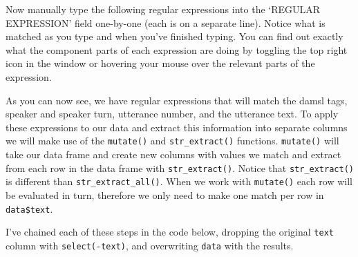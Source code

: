 \documentclass[
  letterpaper,
  DIV=11,
  numbers=noendperiod]{scrreport}
\newenvironment{Shaded}{\begin{snugshade}}{\end{snugshade}}
\newcommand{\NormalTok}[1]{\textcolor[rgb]{0.00,0.00,0.00}{#1}}
\theoremstyle{definition}
\theoremstyle{remark}
\begin{document}
Now manually type the following regular expressions into the `REGULAR
EXPRESSION' field one-by-one (each is on a separate line). Notice what
is matched as you type and when you've finished typing. You can find out
exactly what the component parts of each expression are doing by
toggling the top right icon in the window or hovering your mouse over
the relevant parts of the expression.

\begin{Shaded}
\end{Shaded}

As you can now see, we have regular expressions that will match the
damsl tags, speaker and speaker turn, utterance number, and the
utterance text. To apply these expressions to our data and extract this
information into separate columns we will make use of the
\texttt{mutate()} and \texttt{str\_extract()} functions.
\texttt{mutate()} will take our data frame and create new columns with
values we match and extract from each row in the data frame with
\texttt{str\_extract()}. Notice that \texttt{str\_extract()} is
different than \texttt{str\_extract\_all()}. When we work with
\texttt{mutate()} each row will be evaluated in turn, therefore we only
need to make one match per row in \texttt{data\$text}.

I've chained each of these steps in the code below, dropping the
original \texttt{text} column with \texttt{select(-text)}, and
overwriting \texttt{data} with the results.
\end{document}
